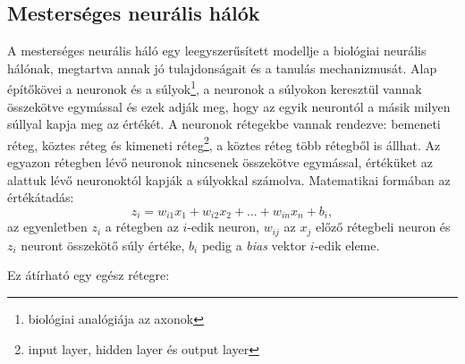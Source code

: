 \documentclass[12pt,letterpaper,twoside,openright]{book}
\begin{document}
\subsection{Mesterséges neurális hálók}
A mesterséges neurális háló egy leegyszerűsített modellje a biológiai neurális hálónak, megtartva annak jó tulajdonságait és a tanulás mechanizmusát. Alap építőkövei a neuronok és a súlyok\footnote{biológiai analógiája az axonok}, a neuronok a súlyokon keresztül vannak összekötve egymással és ezek adják meg, hogy az egyik neurontól a másik milyen súllyal kapja meg az értékét. A neuronok rétegekbe vannak rendezve: bemeneti réteg, köztes réteg és kimeneti réteg\footnote{input layer, hidden layer és output layer}, a köztes réteg több rétegből is állhat. Az egyazon rétegben lévő neuronok nincsenek összekötve egymással, értéküket az alattuk lévő neuronoktól kapják a súlyokkal számolva. Matematikai formában az értékátadás:
\begin{equation}
z_i = w_{i1}x_1 + w_{i2}x_{2} + ... + w_{in}x_n + b_i, 
\end{equation}
az egyenletben $z_i$ a rétegben az $i$-edik neuron, $w_{ij}$ az $x_j$ előző rétegbeli neuron és $z_i$ neuront összekötő súly értéke, $b_i$ pedig a \textit{bias} vektor $i$-edik eleme.  

Ez átírható egy egész rétegre:
\end{document}
